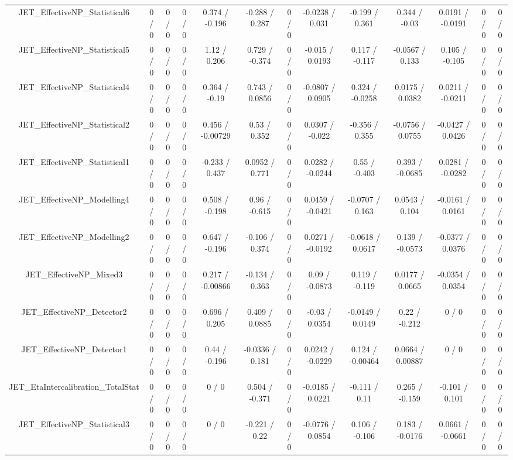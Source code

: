 \documentclass[10pt]{article}
\begin{document}
\begin{table}[htbp]
\begin{center}
\begin{tabular}{|c|c|c|c|c|c|c|c|c|c|c|c|c|}
  JET_EffectiveNP_Statistical6 & 0 / 0 & 0 / 0 & 0 / 0 & 0.374 / -0.196 & -0.288 / 0.287 & 0 / 0 & -0.0238 / 0.031 & -0.199 / 0.361 & 0.344 / -0.03 & 0.0191 / -0.0191 & 0 / 0 & 0 / 0 \\ 
  JET_EffectiveNP_Statistical5 & 0 / 0 & 0 / 0 & 0 / 0 & 1.12 / 0.206 & 0.729 / -0.374 & 0 / 0 & -0.015 / 0.0193 & 0.117 / -0.117 & -0.0567 / 0.133 & 0.105 / -0.105 & 0 / 0 & 0 / 0 \\ 
  JET_EffectiveNP_Statistical4 & 0 / 0 & 0 / 0 & 0 / 0 & 0.364 / -0.19 & 0.743 / 0.0856 & 0 / 0 & -0.0807 / 0.0905 & 0.324 / -0.0258 & 0.0175 / 0.0382 & 0.0211 / -0.0211 & 0 / 0 & 0 / 0 \\ 
  JET_EffectiveNP_Statistical2 & 0 / 0 & 0 / 0 & 0 / 0 & 0.456 / -0.00729 & 0.53 / 0.352 & 0 / 0 & 0.0307 / -0.022 & -0.356 / 0.355 & -0.0756 / 0.0755 & -0.0427 / 0.0426 & 0 / 0 & 0 / 0 \\ 
  JET_EffectiveNP_Statistical1 & 0 / 0 & 0 / 0 & 0 / 0 & -0.233 / 0.437 & 0.0952 / 0.771 & 0 / 0 & 0.0282 / -0.0244 & 0.55 / -0.403 & 0.393 / -0.0685 & 0.0281 / -0.0282 & 0 / 0 & 0 / 0 \\ 
  JET_EffectiveNP_Modelling4 & 0 / 0 & 0 / 0 & 0 / 0 & 0.508 / -0.198 & 0.96 / -0.615 & 0 / 0 & 0.0459 / -0.0421 & -0.0707 / 0.163 & 0.0543 / 0.104 & -0.0161 / 0.0161 & 0 / 0 & 0 / 0 \\ 
  JET_EffectiveNP_Modelling2 & 0 / 0 & 0 / 0 & 0 / 0 & 0.647 / -0.196 & -0.106 / 0.374 & 0 / 0 & 0.0271 / -0.0192 & -0.0618 / 0.0617 & 0.139 / -0.0573 & -0.0377 / 0.0376 & 0 / 0 & 0 / 0 \\ 
  JET_EffectiveNP_Mixed3 & 0 / 0 & 0 / 0 & 0 / 0 & 0.217 / -0.00866 & -0.134 / 0.363 & 0 / 0 & 0.09 / -0.0873 & 0.119 / -0.119 & 0.0177 / 0.0665 & -0.0354 / 0.0354 & 0 / 0 & 0 / 0 \\ 
  JET_EffectiveNP_Detector2 & 0 / 0 & 0 / 0 & 0 / 0 & 0.696 / 0.205 & 0.409 / 0.0885 & 0 / 0 & -0.03 / 0.0354 & -0.0149 / 0.0149 & 0.22 / -0.212 & 0 / 0 & 0 / 0 & 0 / 0 \\ 
  JET_EffectiveNP_Detector1 & 0 / 0 & 0 / 0 & 0 / 0 & 0.44 / -0.196 & -0.0336 / 0.181 & 0 / 0 & 0.0242 / -0.0229 & 0.124 / -0.00464 & 0.0664 / 0.00887 & 0 / 0 & 0 / 0 & 0 / 0 \\ 
  JET_EtaIntercalibration_TotalStat & 0 / 0 & 0 / 0 & 0 / 0 & 0 / 0 & 0.504 / -0.371 & 0 / 0 & -0.0185 / 0.0221 & -0.111 / 0.11 & 0.265 / -0.159 & -0.101 / 0.101 & 0 / 0 & 0 / 0 \\ 
  JET_EffectiveNP_Statistical3 & 0 / 0 & 0 / 0 & 0 / 0 & 0 / 0 & -0.221 / 0.22 & 0 / 0 & -0.0776 / 0.0854 & 0.106 / -0.106 & 0.183 / -0.0176 & 0.0661 / -0.0661 & 0 / 0 & 0 / 0 \\ 

\end{tabular}
\end{center}
\end{table}
\end{document}
